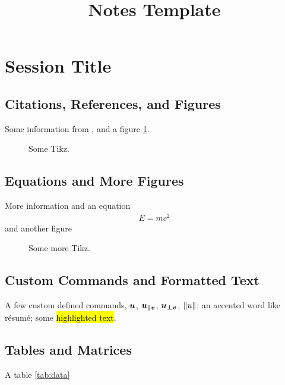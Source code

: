 \documentclass[11pt,a4paper]{article}
\title{Notes Template}
\begin{document}
\maketitle
\newpage

\tableofcontents %
\newpage

\section{Session Title}

\subsection{Citations, References, and Figures}

Some information from \cite{feller1968}, 
and a figure \ref{fig:tikz1}.

\begin{figure}[!htb]
\centering

\caption{Some Tikz.}
\label{fig:tikz1}
\end{figure}

\subsection{Equations and More Figures}

More information and an equation
\begin{align}
E = mc^2
\end{align}
and another figure

\begin{figure}[!htb]
\centering

\caption{Some more Tikz.}
\label{fig:tikz2}
\end{figure}

\subsection{Custom Commands and Formatted Text}

A few custom defined commands, \(\boldsymbol{u}\), \(\boldsymbol{{u}_{\parallel {v}}}\), \(\boldsymbol{{u}_{\perp {v}}}\), \(\left\lVert{u}\right\rVert\); 
an accented word like résumé;
some \hl{highlighted text}.

\pagebreak

\subsection{Tables and Matrices}

A table \ref{tab:data}
\end{document}
